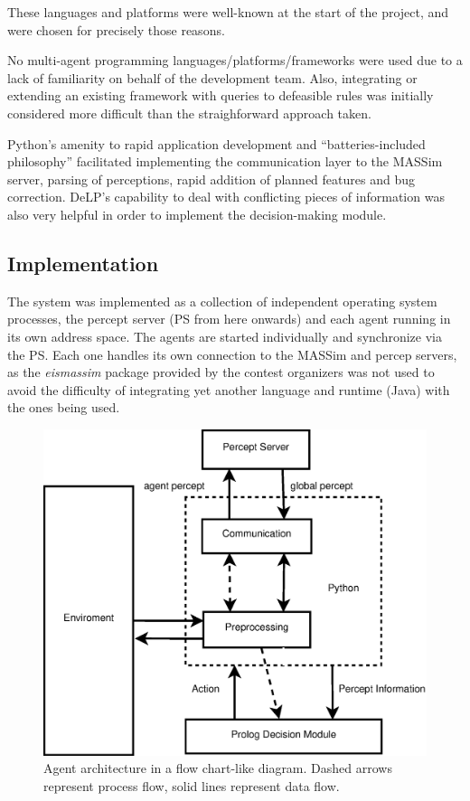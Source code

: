     These languages and platforms were well-known at the start of the project,
    and were chosen for precisely those reasons.
    
    No multi-agent programming languages/platforms/frameworks were used due to 
    a lack of familiarity on behalf of the development team. 
    Also, integrating or extending an existing framework with queries to
    defeasible rules was initially considered more difficult than the
    straighforward approach taken.

    Python's amenity to rapid application development and ``batteries-included 
    philosophy'' facilitated implementing the communication layer to the MASSim 
    server, parsing of perceptions, rapid addition of planned features and bug 
    correction. DeLP's capability to deal with conflicting pieces of
    information was also very helpful in order to implement the
    decision-making module. 

\subsection{Implementation}
    The system was implemented as a collection of independent operating system
    processes, the percept server (PS from here onwards) and each agent running
    in its own address space.  The agents are started individually and
    synchronize via the PS.  Each one handles its own connection to
    the MASSim and percep servers, as the \textit{eismassim} package provided
    by the contest organizers was not used to avoid the difficulty of
    integrating yet another language and runtime (Java) with the ones being
    used. 
    
    \begin{figure}
    \centering
    \includegraphics[scale=.3]{agentarchitecture.eps}
    \caption{Agent architecture in a flow chart-like diagram. Dashed arrows
    represent process flow, solid lines represent data flow.}
    \label{fig:architecture}
    \end{figure}

